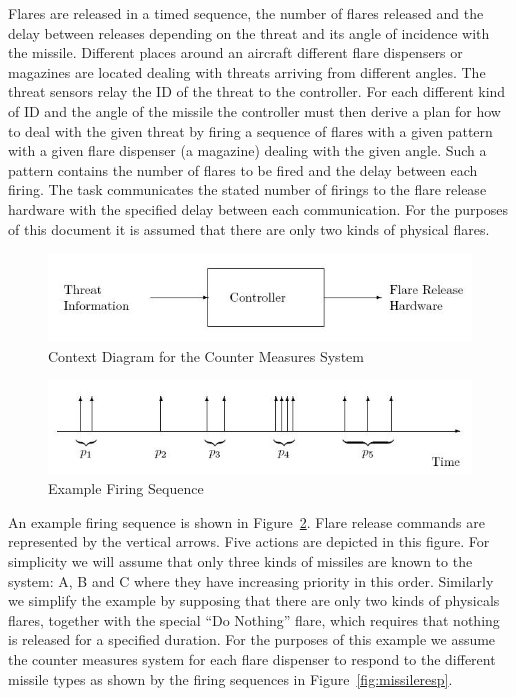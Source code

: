 \documentclass{overturerepchap}
\begin{document}
Flares are released in a timed sequence, the number of flares released
and the delay between releases depending on the threat and its angle
of incidence with the missile. Different places around an aircraft
different flare dispensers or magazines are located dealing with
threats arriving from different angles. The threat sensors relay the
ID of the threat to the controller. For each different kind of ID and
the angle of the missile the controller must then derive a plan for
how to deal with the given threat by firing a sequence of flares with
a given pattern with a given flare dispenser (a magazine) dealing with
the given angle. Such a pattern contains the number of flares to be
fired and the delay between each firing. The task communicates the
stated number of firings to the flare release hardware with the
specified delay between each communication. For the purposes of this
document it is assumed that there are only two kinds of physical
flares.

\begin{figure}
\begin{center}
\includegraphics[width=\textwidth]{figures/contextdia.jpg}
\end{center}
\caption{Context Diagram for the Counter Measures System}\label{fig:contextdiag}\end{figure}

\begin{figure}
\begin{center}
\includegraphics[width=\textwidth]{figures/flareseqs.jpg}
\end{center}
\caption{Example Firing Sequence}\label{fig:firing}
\end{figure}


An example firing sequence is shown in Figure~\ref{fig:firing}. Flare
release commands are represented by the vertical arrows. Five actions
are depicted in this figure. For simplicity we will assume that only
three kinds of missiles are known to the system: A, B and C where they
have increasing priority in this order. Similarly we simplify the
example by supposing that there are only two kinds of physicals
flares, together with the special ``Do Nothing'' flare, which requires
that nothing is released for a specified duration.  For the purposes
of this example we assume the counter measures system for each flare
dispenser to respond to the different missile types as shown by the
firing sequences in Figure~\ref{fig:missileresp}.
\end{document}
